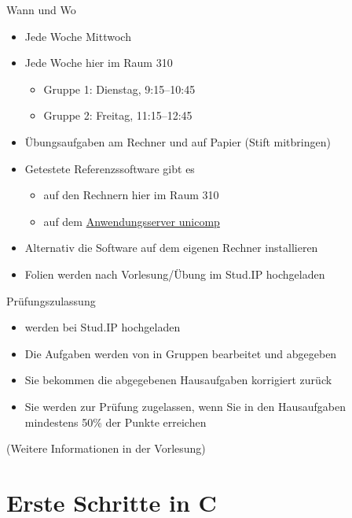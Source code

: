 \documentclass[10pt]{beamer} %
\begin{document}
\begin{frame}{Wann und Wo}

	\begin{itemize}
		\item Jede Woche Mittwoch 
		\item Jede Woche  hier im Raum 310
		\begin{itemize}
			\item Gruppe 1: Dienstag, 9:15--10:45
			\item Gruppe 2: Freitag, 11:15--12:45
		\end{itemize}
		\item Übungsaufgaben am Rechner und auf Papier (Stift mitbringen)
		\item Getestete Referenzssoftware gibt es
		\begin{itemize}
			\item auf den Rechnern hier im Raum 310
			\item auf dem \href{https://www.itmz.uni-rostock.de/onlinedienste/anwendungsserver-des-itmz/anwendungsserver-des-itmz/}{Anwendungsserver unicomp}
		\end{itemize}
		\item Alternativ die Software auf dem eigenen Rechner installieren
		\item Folien werden nach Vorlesung/Übung im Stud.IP hochgeladen
	\end{itemize}

\end{frame}

\begin{frame}{Prüfungszulassung}
	
	\begin{itemize}
		\item {} werden bei Stud.IP hochgeladen
		\item Die Aufgaben werden von in Gruppen bearbeitet und abgegeben
		\item Sie bekommen die abgegebenen Hausaufgaben korrigiert zurück
		\item Sie werden zur Prüfung zugelassen, wenn Sie in den Hausaufgaben mindestens 50\% der Punkte erreichen
	\end{itemize}
	
	(Weitere Informationen in der Vorlesung)
	
\end{frame}

\section{Erste Schritte in C}
\end{document}
